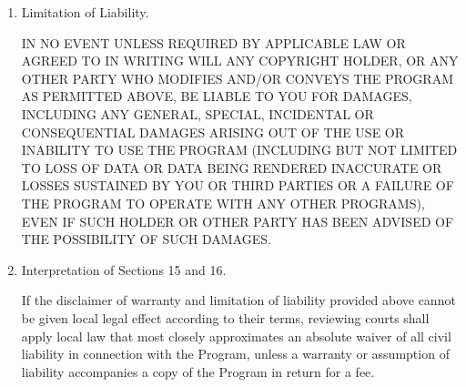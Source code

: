 \documentclass[a4paper,10pt,DIV=15,openany]{scrbook}
\begin{document}
{\begin{shaded}
\begin{enumerate}
\item Limitation of Liability.

 IN NO EVENT UNLESS REQUIRED BY APPLICABLE LAW OR AGREED TO IN
 WRITING WILL ANY COPYRIGHT HOLDER, OR ANY OTHER PARTY WHO MODIFIES
 AND/OR CONVEYS THE PROGRAM AS PERMITTED ABOVE, BE LIABLE TO YOU FOR
 DAMAGES, INCLUDING ANY GENERAL, SPECIAL, INCIDENTAL OR CONSEQUENTIAL
 DAMAGES ARISING OUT OF THE USE OR INABILITY TO USE THE PROGRAM
 (INCLUDING BUT NOT LIMITED TO LOSS OF DATA OR DATA BEING RENDERED
 INACCURATE OR LOSSES SUSTAINED BY YOU OR THIRD PARTIES OR A FAILURE
 OF THE PROGRAM TO OPERATE WITH ANY OTHER PROGRAMS), EVEN IF SUCH
 HOLDER OR OTHER PARTY HAS BEEN ADVISED OF THE POSSIBILITY OF SUCH
 DAMAGES.

\item Interpretation of Sections 15 and 16.

If the disclaimer of warranty and limitation of liability provided
above cannot be given local legal effect according to their terms,
reviewing courts shall apply local law that most closely approximates
an absolute waiver of all civil liability in connection with the
Program, unless a warranty or assumption of liability accompanies a
copy of the Program in return for a fee.


\end{enumerate}
\end{shaded}}
\end{document}
